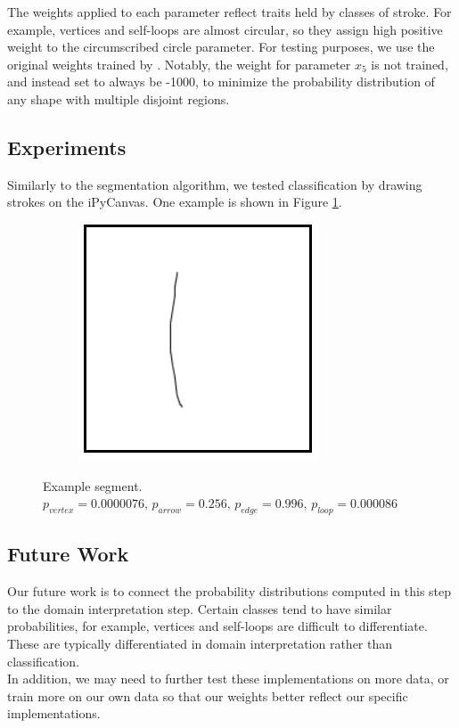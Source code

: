 The weights applied to each parameter reflect traits held by classes of stroke. For example, vertices and self-loops are almost circular, so they assign high positive weight to the circumscribed circle parameter. For testing purposes, we use the original weights trained by \citeauthor{daly2015hand} \cite{daly2015hand}. Notably, the weight for parameter $x_5$ is not trained, and instead set to always be -1000, to minimize the probability distribution of any shape with multiple disjoint regions.

\subsection{Experiments}
Similarly to the segmentation algorithm, we tested classification by drawing strokes on the iPyCanvas. One example is shown in Figure \ref{fig:classification_example}.

\begin{figure}
	\centering
	\begin{subfigure}{0.9\textwidth}
		\centering
		\includegraphics[scale=0.5]{./img/classificationexample}
	\end{subfigure}
	\caption{Example segment. $p_{vertex} = 0.0000076\text{, }   p_{arrow} = 0.256\text{, } p_{edge} = 0.996\text{, }  p_{loop} = 0.000086$}
	\label{fig:classification_example}
\end{figure}

\subsection{Future Work}

Our future work is to connect the probability distributions computed in this step to the domain interpretation step. Certain classes tend to have similar probabilities, for example, vertices and self-loops are difficult to differentiate. These are typically differentiated in domain interpretation rather than classification. \\

In addition, we may need to further test these implementations on more data, or train more on our own data so that our weights better reflect our specific implementations.

